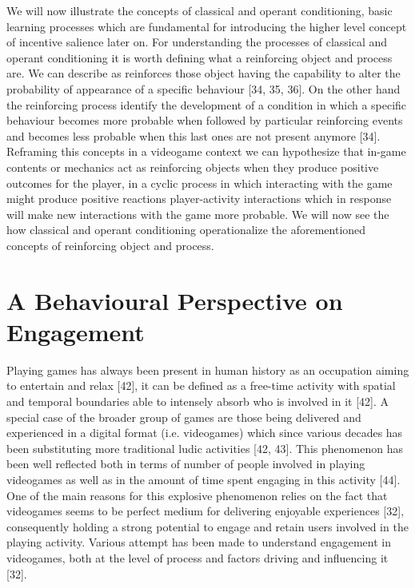 We will now illustrate the concepts of classical and operant conditioning, basic learning processes which are fundamental for introducing the higher level concept of incentive salience later on. For understanding the processes of classical and operant conditioning it is worth defining what a reinforcing object and process are. We can describe as reinforces those object having the capability to alter the probability of appearance of a specific behaviour [34, 35, 36].  On the other hand the reinforcing process identify the development of a condition in which a specific behaviour becomes more probable when followed by particular reinforcing events and becomes less probable when this last ones are not present anymore [34]. Reframing this concepts in a videogame context we can hypothesize that in-game contents or mechanics act as reinforcing objects when they produce positive outcomes for the player, in a cyclic process in which interacting with the game might produce positive reactions player-activity interactions which in response will make new interactions with the game more probable. 
We will now see the how classical and operant conditioning operationalize the aforementioned concepts of reinforcing object and process.

\section{A Behavioural Perspective on Engagement}
\label{engagement}
Playing games has always been present in human history as an occupation aiming to entertain and relax [42], it can be defined as a free-time activity with spatial and temporal boundaries able to intensely absorb who is involved in it [42]. A special case of the broader group of games are those being delivered and experienced in a digital format (i.e. videogames) which since various decades has been substituting more traditional ludic activities [42, 43]. This phenomenon has been well reflected both in terms of number of people involved in playing videogames as well as in the amount of time spent engaging in this activity [44]. One of the main reasons for this explosive phenomenon relies on the fact that videogames seems to be perfect medium for delivering enjoyable experiences [32], consequently holding a strong potential to engage and retain users involved in the playing activity. Various attempt has been made to understand engagement in videogames, both at the level of process and factors driving and influencing it [32].

